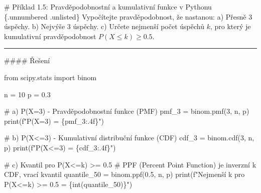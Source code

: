 \documentclass[
  czech,
  11pt,
  letterpaper,
  DIV=11,
  numbers=noendperiod]{scrreprt}
\newenvironment{Shaded}{\begin{snugshade}}{\end{snugshade}}
\newcommand{\BuiltInTok}[1]{\textcolor[rgb]{0.00,0.23,0.31}{#1}}
\newcommand{\CommentTok}[1]{\textcolor[rgb]{0.37,0.37,0.37}{#1}}
\newcommand{\DecValTok}[1]{\textcolor[rgb]{0.68,0.00,0.00}{#1}}
\newcommand{\FloatTok}[1]{\textcolor[rgb]{0.68,0.00,0.00}{#1}}
\newcommand{\ImportTok}[1]{\textcolor[rgb]{0.00,0.46,0.62}{#1}}
\newcommand{\NormalTok}[1]{\textcolor[rgb]{0.00,0.23,0.31}{#1}}
\newcommand{\OperatorTok}[1]{\textcolor[rgb]{0.37,0.37,0.37}{#1}}
\newcommand{\SpecialCharTok}[1]{\textcolor[rgb]{0.37,0.37,0.37}{#1}}
\newcommand{\SpecialStringTok}[1]{\textcolor[rgb]{0.13,0.47,0.30}{#1}}
\begin{document}
\begin{tcolorbox}[enhanced jigsaw, arc=.35mm, bottomrule=.15mm, bottomtitle=1mm, breakable, colback=white, colbacktitle=quarto-callout-note-color!10!white, colframe=quarto-callout-note-color-frame, coltitle=black, left=2mm, leftrule=.75mm, opacityback=0, opacitybacktitle=0.6, rightrule=.15mm, title=\textcolor{quarto-callout-note-color}{\faInfo}\hspace{0.5em}{Poznámka}, titlerule=0mm, toprule=.15mm, toptitle=1mm]

\# Příklad 1.5: Pravděpodobnostní a kumulativní funkce v Pythonu
\{.unnumbered .unlisted\} Vypočítejte pravděpodobnost, že nastanou: a)
Přesně 3 úspěchy. b) Nejvýše 3 úspěchy. c) Určete nejmenší počet úspěchů
\(k\), pro který je kumulativní pravděpodobnost \(P(X \le k) \ge 0.5\).

\begin{center}\rule{0.5\linewidth}{0.5pt}\end{center}

\#\#\#\# Řešení

\begin{Shaded}
\begin{Highlighting}[]
\ImportTok{from}\NormalTok{ scipy.stats }\ImportTok{import}\NormalTok{ binom}

\NormalTok{n }\OperatorTok{=} \DecValTok{10}
\NormalTok{p }\OperatorTok{=} \FloatTok{0.3}

\CommentTok{\# a) P(X=3) {-} Pravděpodobnostní funkce (PMF)}
\NormalTok{pmf\_3 }\OperatorTok{=}\NormalTok{ binom.pmf(}\DecValTok{3}\NormalTok{, n, p)}
\BuiltInTok{print}\NormalTok{(}\SpecialStringTok{f"P(X=3) = }\SpecialCharTok{\{}\NormalTok{pmf\_3}\SpecialCharTok{:.4f\}}\SpecialStringTok{"}\NormalTok{)}

\CommentTok{\# b) P(X\textless{}=3) {-} Kumulativní distribuční funkce (CDF)}
\NormalTok{cdf\_3 }\OperatorTok{=}\NormalTok{ binom.cdf(}\DecValTok{3}\NormalTok{, n, p)}
\BuiltInTok{print}\NormalTok{(}\SpecialStringTok{f"P(X\textless{}=3) = }\SpecialCharTok{\{}\NormalTok{cdf\_3}\SpecialCharTok{:.4f\}}\SpecialStringTok{"}\NormalTok{)}

\CommentTok{\# c) Kvantil pro P(X\textless{}=k) \textgreater{}= 0.5}
\CommentTok{\# PPF (Percent Point Function) je inverzní k CDF, vrací kvantil}
\NormalTok{quantile\_50 }\OperatorTok{=}\NormalTok{ binom.ppf(}\FloatTok{0.5}\NormalTok{, n, p)}
\BuiltInTok{print}\NormalTok{(}\SpecialStringTok{f"Nejmenší k pro P(X\textless{}=k) \textgreater{}= 0.5 = }\SpecialCharTok{\{}\BuiltInTok{int}\NormalTok{(quantile\_50)}\SpecialCharTok{\}}\SpecialStringTok{"}\NormalTok{)}
\end{Highlighting}
\end{Shaded}

\end{tcolorbox}
\end{document}
